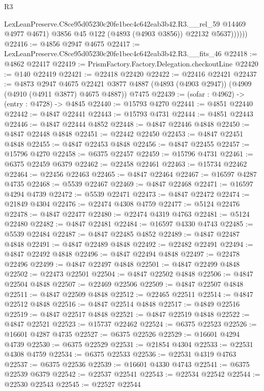 \begin{lexlean}{R3}
\begin{coremodule}
                LexLeanPreserve.C8ce95d05230c20fe1bec4c642eab3b42.R3.__rel_59 @14469 @4977 @4671)
                @3856
                @45
                @122
                (@4893 (@4903 @3856))
                @22132
                @5637))))))
@22416 := @4856 @2947 @4675
@22417 := LexLeanPreserve.C8ce95d05230c20fe1bec4c642eab3b42.R3.__fits_46
@22418 := @4862 @22417
@22419 := PrismFactory.Factory.Delegation.checkoutLine
@22420 := @140 @22419
@22421 := @22418 @22420
@22422 := @22416 @22421
@22437 := @4873
    @2947
    @4675
    @22421
    @3877
    @4887
    (@4893 (@4903 @2947))
    (@4909 (@4910 (@4911 @3877) @4675 @4887))
    @7475
@22439 := (sofar : @4962) -> (entry : @4728) -> @4845
@22440 := @15793 @4270
@22441 := @4851 @22440
@22442 := @4847 @22441
@22443 := @15793 @4731
@22444 := @4851 @22443
@22446 := @4847 @22444 @4852
@22448 := @4847 @22446 @4848
@22450 := @4847 @22448 @4848
@22451 := @22442 @22450
@22453 := @4847 @22451 @4848
@22455 := @4847 @22453 @4848
@22456 := @4847 @22455
@22457 := @15796 @4270
@22458 := @6375 @22457
@22459 := @15796 @4731
@22461 := @6375 @22459 @6379
@22462 := @22458 @22461
@22463 := @15734 @22462
@22464 := @22456 @22463
@22465 := @4847 @22464
@22467 := @16597 @4287 @4735
@22468 := @5539 @22467
@22469 := @4847 @22468
@22471 := @16597 @4294 @4739
@22472 := @5539 @22471
@22473 := @4847 @22472
@22474 := @21849 @4304
@22476 := @22474 @4308 @4759
@22477 := @5124 @22476
@22478 := @4847 @22477
@22480 := @22474 @4319 @4763
@22481 := @5124 @22480
@22482 := @4847 @22481
@22484 := @16597 @4330 @4743
@22485 := @5539 @22484
@22487 := @4847 @22485 @4852
@22489 := @4847 @22487 @4848
@22491 := @4847 @22489 @4848
@22492 := @22482 @22491
@22494 := @4847 @22492 @4848
@22496 := @4847 @22494 @4848
@22497 := @22478 @22496
@22499 := @4847 @22497 @4848
@22501 := @4847 @22499 @4848
@22502 := @22473 @22501
@22504 := @4847 @22502 @4848
@22506 := @4847 @22504 @4848
@22507 := @22469 @22506
@22509 := @4847 @22507 @4848
@22511 := @4847 @22509 @4848
@22512 := @22465 @22511
@22514 := @4847 @22512 @4848
@22516 := @4847 @22514 @4848
@22517 := @4849 @22516
@22519 := @4847 @22517 @4848
@22521 := @4847 @22519 @4848
@22522 := @4847 @22521
@22523 := @15737 @22462
@22524 := @6375 @22523
@22526 := @16601 @4287 @4735
@22527 := @6375 @22526
@22529 := @16601 @4294 @4739
@22530 := @6375 @22529
@22531 := @21854 @4304
@22533 := @22531 @4308 @4759
@22534 := @6375 @22533
@22536 := @22531 @4319 @4763
@22537 := @6375 @22536
@22539 := @16601 @4330 @4743
@22541 := @6375 @22539 @6379
@22542 := @22537 @22541
@22543 := @22534 @22542
@22544 := @22530 @22543
@22545 := @22527 @22544

\end{coremodule}
\end{lexlean}

